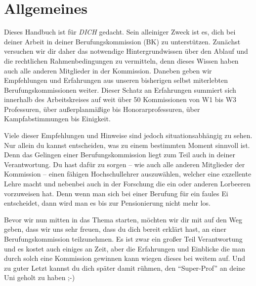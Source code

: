 \section{Allgemeines}
Dieses Handbuch ist für \emph{DICH} gedacht. Sein alleiniger Zweck ist es, dich bei deiner Arbeit in deiner Berufungskommission (BK) zu unterstützen. Zunächst versuchen wir dir daher das notwendige Hintergrundwissen über den Ablauf und die rechtlichen Rahmenbedingungen zu vermitteln, denn dieses Wissen haben auch alle anderen Mitglieder in der Kommission. Daneben geben wir Empfehlungen und Erfahrungen aus unseren bisherigen selbst miterlebten Berufungskommissionen weiter. Dieser Schatz an Erfahrungen summiert sich innerhalb des Arbeitskreises auf weit über 50 Kommissionen von W1 bis W3 Professuren, über außerplanmäßige bis Honorarprofessuren, über Kampfabstimmungen bis Einigkeit.

Viele dieser Empfehlungen und Hinweise sind jedoch situationsabhängig zu sehen. Nur allein du kannst entscheiden, was zu einem bestimmten Moment sinnvoll ist. Denn das Gelingen einer Berufungskommission liegt zum Teil auch in deiner Verantwortung. Du hast dafür zu sorgen -- wie auch alle anderen Mitglieder der Kommission -- einen fähigen Hochschullehrer auszuwählen, welcher eine exzellente Lehre macht und nebenbei auch in der Forschung die ein oder anderen Lorbeeren vorzuweisen hat. Denn wenn man sich bei einer Berufung für ein faules Ei entscheidet, dann wird man es bis zur Pensionierung nicht mehr los.

Bevor wir nun mitten in das Thema starten, möchten wir dir mit auf den Weg geben, dass wir uns sehr freuen, dass du dich bereit erklärt hast, an einer Berufungskommission teilzunehmen. Es ist zwar ein großer Teil Verantwortung und es kostet auch einiges an Zeit, aber die Erfahrungen und Einblicke die man durch solch eine Kommission gewinnen kann wiegen dieses bei weitem auf. Und zu guter Letzt kannst du dich später damit rühmen, den "`Super-Prof"' an deine Uni geholt zu haben ;-)

